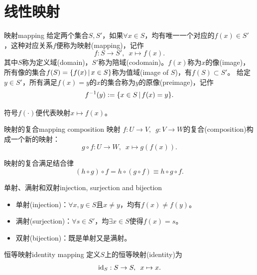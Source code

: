\chapter{线性映射}
\label{chap:linear mapping}

\begin{definition}{映射}{mapping}
	给定两个集合$S,S'$，如果$\forall x \in S$，均有唯一一个对应的$f(x) \in S'$，这种对应关系$f$便称为映射(mapping)，记作
	\begin{equation}
		f:S \to S',\enspace x \mapsto f(x).
	\end{equation}
	其中$S$称为定义域(domain)，$S'$称为陪域(codomain)。$f(x)$称为$x$的像(image)，所有像的集合$f(S) = \{f(x)\,\vert\,x \in S\}$称为值域(image of $S$)，有$f(S) \subset S'$。
	\tcblower
	给定$y \in S'$，所有满足$f(x) = y$的$x$的集合称为$y$的原像(preimage)，记作
	\begin{equation}
		f^{-1}(y) := \{x \in S\,\vert\,f(x) = y\}.
	\end{equation}
\end{definition}

\begin{remark}
	符号$f(\cdot)$便代表映射$x \mapsto f(x)$。
\end{remark}

\begin{definition}{映射的复合}{mapping composition}
	映射 $f:U \to V,\enspace g:V \to W$的复合(composition)构成一个新的映射：
	\begin{equation}\label{eq:la-map-composition}
		g \circ f:U \to W,\enspace x \mapsto g(f(x)).
	\end{equation}
\end{definition}
\begin{corollary}
	映射的复合满足结合律
	\[
		(h \circ g) \circ f = h \circ (g \circ f) \equiv h \circ g \circ f.
	\]
\end{corollary}
\begin{definition}{单射、满射和双射}{injection, surjection and bijection}
	\begin{itemize}
		\item 单射(injection)：$\forall x,y \in S$且$x \neq y$，均有$f(x) \neq f(y)$。
		\item 满射(surjection)：$\forall s \in S'$，均$\exists x \in S$使得$f(x) = s$。%
		\item 双射(bijection)：既是单射又是满射。
	\end{itemize}
\end{definition}

\begin{definition}
	{恒等映射}{identity mapping}
	定义$S$上的恒等映射(identity)为
	\begin{equation}
		\operatorname{id}_S:S \to S,\enspace x \mapsto x.
	\end{equation}
\end{definition}


